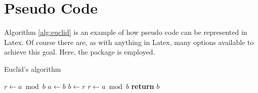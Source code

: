 \section{Pseudo Code}
Algorithm \ref{alg:euclid} is an example of how pseudo code can be represented in Latex.
Of course there are, as with anything in Latex, many options available to achieve this goal.
Here, the  package is employed.
\begin{algorithm}
    \caption{Euclid's algorithm}
    \label{alg:euclid}
    \begin{algorithmic}[1] %
         
            \State $r\gets a \bmod b$
             
                \State $a \gets b$
                \State $b \gets r$
                \State $r \gets a \bmod b$
            \EndWhile\label{euclidendwhile}
            \State \textbf{return} $b$
        \EndProcedure
    \end{algorithmic}
\end{algorithm}





